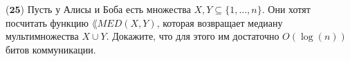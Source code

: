 ($\mathbf{25}$)
Пусть у Алисы и Боба есть множества $X, Y \subseteq \{1, \dots, n\}$. Они хотят посчитать функцию $\lang{MED}(X, Y)$, которая
возвращает медиану мультимножества $X \cup Y$. Докажите, что для этого им достаточно $O(\log(n))$ битов коммуникации.